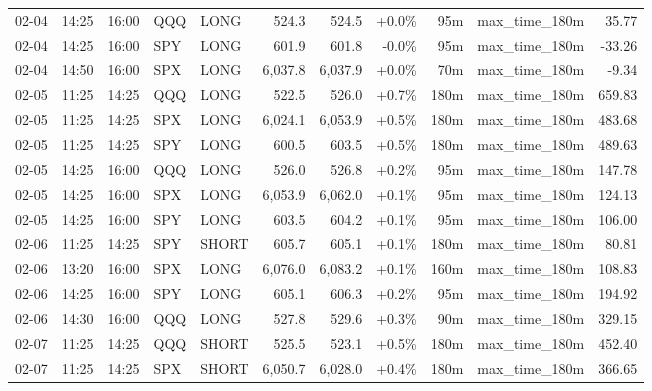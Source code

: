 \documentclass[11pt,a4paper,twoside]{article}
\begin{document}
\begin{center}
\begin{longtable}{>{\color{txtmain}}l l l l l r r r r >{\color{txtmain}}l r}
02-04 & 14:25 & 16:00 & QQQ & LONG & 524.3 & 524.5 & \textcolor{wingreen}{+0.0\%} & 95m & max\_time\_180m & \textcolor{wingreen}{35.77} \\
02-04 & 14:25 & 16:00 & SPY & LONG & 601.9 & 601.8 & \textcolor{lossred}{-0.0\%} & 95m & max\_time\_180m & \textcolor{lossred}{-33.26} \\
02-04 & 14:50 & 16:00 & SPX & LONG & 6,037.8 & 6,037.9 & \textcolor{wingreen}{+0.0\%} & 70m & max\_time\_180m & \textcolor{lossred}{-9.34} \\
02-05 & 11:25 & 14:25 & QQQ & LONG & 522.5 & 526.0 & \textcolor{wingreen}{+0.7\%} & 180m & max\_time\_180m & \textcolor{wingreen}{659.83} \\
02-05 & 11:25 & 14:25 & SPX & LONG & 6,024.1 & 6,053.9 & \textcolor{wingreen}{+0.5\%} & 180m & max\_time\_180m & \textcolor{wingreen}{483.68} \\
02-05 & 11:25 & 14:25 & SPY & LONG & 600.5 & 603.5 & \textcolor{wingreen}{+0.5\%} & 180m & max\_time\_180m & \textcolor{wingreen}{489.63} \\
02-05 & 14:25 & 16:00 & QQQ & LONG & 526.0 & 526.8 & \textcolor{wingreen}{+0.2\%} & 95m & max\_time\_180m & \textcolor{wingreen}{147.78} \\
02-05 & 14:25 & 16:00 & SPX & LONG & 6,053.9 & 6,062.0 & \textcolor{wingreen}{+0.1\%} & 95m & max\_time\_180m & \textcolor{wingreen}{124.13} \\
02-05 & 14:25 & 16:00 & SPY & LONG & 603.5 & 604.2 & \textcolor{wingreen}{+0.1\%} & 95m & max\_time\_180m & \textcolor{wingreen}{106.00} \\
02-06 & 11:25 & 14:25 & SPY & SHORT & 605.7 & 605.1 & \textcolor{wingreen}{+0.1\%} & 180m & max\_time\_180m & \textcolor{wingreen}{80.81} \\
02-06 & 13:20 & 16:00 & SPX & LONG & 6,076.0 & 6,083.2 & \textcolor{wingreen}{+0.1\%} & 160m & max\_time\_180m & \textcolor{wingreen}{108.83} \\
02-06 & 14:25 & 16:00 & SPY & LONG & 605.1 & 606.3 & \textcolor{wingreen}{+0.2\%} & 95m & max\_time\_180m & \textcolor{wingreen}{194.92} \\
02-06 & 14:30 & 16:00 & QQQ & LONG & 527.8 & 529.6 & \textcolor{wingreen}{+0.3\%} & 90m & max\_time\_180m & \textcolor{wingreen}{329.15} \\
02-07 & 11:25 & 14:25 & QQQ & SHORT & 525.5 & 523.1 & \textcolor{wingreen}{+0.5\%} & 180m & max\_time\_180m & \textcolor{wingreen}{452.40} \\
02-07 & 11:25 & 14:25 & SPX & SHORT & 6,050.7 & 6,028.0 & \textcolor{wingreen}{+0.4\%} & 180m & max\_time\_180m & \textcolor{wingreen}{366.65} \\

\end{longtable}
\end{center}
\end{document}
